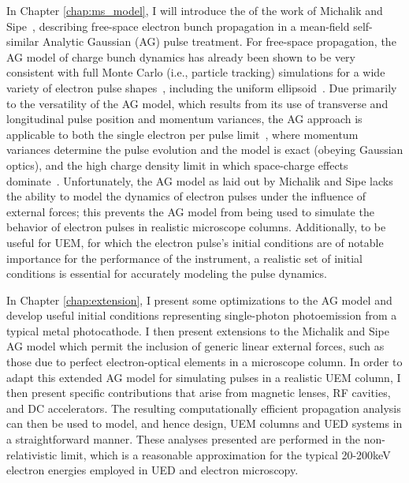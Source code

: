 In Chapter \ref{chap:ms_model}, I will introduce the of the work of Michalik and Sipe~\cite{michalik_analytic_2006,michalik_erratum:_2008}, describing free-space electron bunch propagation in a mean-field self-similar Analytic Gaussian (AG) pulse treatment.
For free-space propagation, the AG model of charge bunch dynamics has already been shown to be very consistent with full Monte Carlo (i.e., particle tracking) simulations for a wide variety of electron pulse shapes~\cite{michalik_analytic_2006,michalik_evolution_2009}, including the uniform ellipsoid~\cite{luiten_how_2004}.
Due primarily to the versatility of the AG model, which results from its use of transverse and longitudinal pulse position and momentum variances, the AG approach is applicable to both the single electron per pulse limit~\cite{lobastov_four-dimensional_2005}, where momentum variances determine the pulse evolution and the model is exact (obeying Gaussian optics), and the high charge density limit in which space-charge effects dominate~\cite{luiten_how_2004,siwick_ultrafast_2002,cao_femtosecond_2003}.
Unfortunately, the AG model as laid out by Michalik and Sipe lacks the ability to model the dynamics of electron pulses under the influence of external forces; this prevents the AG model from being used to simulate the behavior of electron pulses in realistic microscope columns.
Additionally, to be useful for UEM, for which the electron pulse's initial conditions are of notable importance for the performance of the instrument, a realistic set of initial conditions is essential for accurately modeling the pulse dynamics.

In Chapter \ref{chap:extension}, I present some optimizations to the AG model and develop useful initial conditions representing single-photon photoemission from a typical metal photocathode.
I then present extensions to the Michalik and Sipe AG model which permit the inclusion of generic linear external forces, such as those due to perfect electron-optical elements in a microscope column.
In order to adapt this extended AG model for simulating pulses in a realistic UEM column, I then present specific contributions that arise from magnetic lenses, RF cavities, and DC accelerators.
The resulting computationally efficient propagation analysis can then be used to model, and hence design, UEM columns and UED systems in a straightforward manner.
These analyses presented are performed in the non-relativistic limit, which is a reasonable approximation for the typical 20-200keV electron energies employed in UED and electron microscopy.

